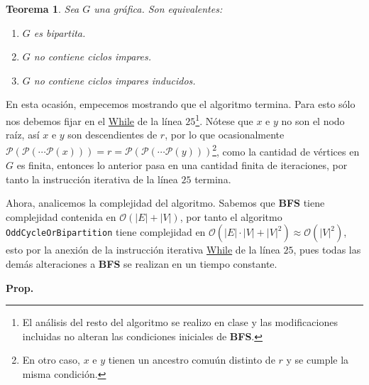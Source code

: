 \documentclass{article}
\newcommand{\code}[1]{\textcolor{white!25!black}{\texttt{#1}}}
\newtheorem*{theorem}{Teorema}
\begin{document}
\begin{enumerate}
\begin{center}
{\begin{minipage}[b][1\height]
        \begin{theorem}
          Sea $G$ una gr\'afica. Son equivalentes:
          \begin{enumerate}
          \item $G$ es bipartita.
          \item $G$ no contiene ciclos impares.
          \item $G$ no contiene ciclos impares inducidos.
          \end{enumerate}
          
        \end{theorem}
    \end{minipage}}
  \end{center}
  En esta ocasi\'on, empecemos mostrando que el algoritmo termina. Para esto s\'olo nos
  debemos fijar en el \underline{While} de  la l\'inea $25$\footnote{El an\'alisis del
    resto del algoritmo se realizo en clase y las modificaciones incluidas no alteran las
    condiciones iniciales de \textbf{BFS}.}. N\'otese que $x$ e $y$ no son el nodo  ra\'iz,
  as\'i $x$ e $y$ son descendientes de $r$, por lo que ocasionalmente
  $\mathcal{P}(\mathcal{P}(\dotsm\mathcal{P}(x))) = r = \mathcal{P}(\mathcal{P}(\dotsm\mathcal{P}(y)))$\footnote{En
  otro caso, $x$ e $y$ tienen un ancestro comu\'un distinto de $r$ y se cumple la misma condici\'on.},
  como la cantidad de v\'ertices en $G$ es finita, entonces lo anterior pasa en una cantidad
  finita de iteraciones, por tanto la instrucci\'on iterativa de la l\'inea $25$ termina.
  
  Ahora, analicemos la complejidad del algoritmo. Sabemos que \textbf{BFS} tiene complejidad contenida
  en $\mathcal{O}(|E| + |V|)$, por tanto el algoritmo \code{OddCycleOrBipartition} tiene complejidad
  en $\mathcal{O}(|E|\cdot|V| + |V|^2) \approx \mathcal{O}(|V|^2)$, esto por la anexi\'on de la instrucci\'on
  iterativa \underline{While} de la l\'inea $25$, pues todas las dem\'as alteraciones a \textbf{BFS} se realizan
  en un tiempo constante.
  
  \textbf{Prop.}
\end{enumerate}
\end{document}
